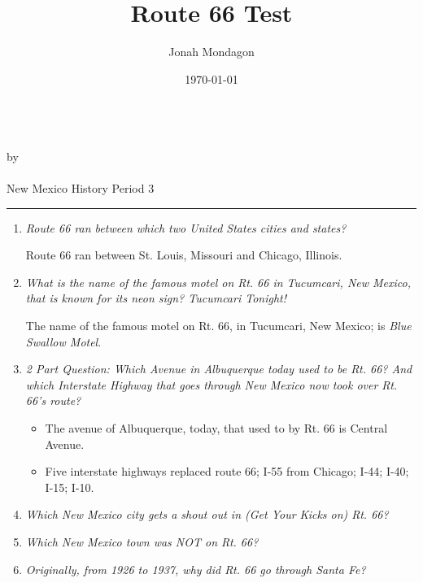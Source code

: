 \documentclass[12pt]{article}
\newcommand{\PutTitle}[1]
{
    \begin{center}
        {\huge\bfseries\thetitle}\\
        by \theauthor\\
        \thedate\\
        #1
    \end{center}
    \hrule
}
\begin{document}
\title{Route 66 Test}
\author{Jonah Mondagon}
\date{\today}
\PutTitle{New Mexico History Period 3}

\pagestyle{headings}

\doublespacing

\begin{enumerate}
    \item{\textit{Route 66 ran between which two United States cities and states?}}
        \begin{addmargin}[24pt]{0in}
            Route 66 ran between St. Louis, Missouri and Chicago, Illinois.
        \end{addmargin}
    \item{\textit{What is the name of the famous motel on Rt. 66 in Tucumcari, New Mexico, that is known for its neon sign? Tucumcari Tonight!}}
        \begin{addmargin}[24pt]{0in}
            The name of the famous motel on Rt. 66, in Tucumcari, New Mexico; is \textit{Blue Swallow Motel}.
        \end{addmargin}
    \item{\textit{2 Part Question: Which Avenue in Albuquerque today used to be Rt. 66? And which Interstate Highway that goes through New Mexico now took over Rt. 66's route?}}
        \begin{addmargin}[24pt]{0in}
            \begin{itemize}
                \item{The avenue of Albuquerque, today, that used to by Rt. 66 is Central Avenue.}
                \item{Five interstate highways replaced route 66; I-55 from Chicago; I-44; I-40; I-15; I-10.}
            \end{itemize}
        \end{addmargin}
    \item{\textit{Which New Mexico city gets a shout out in (Get Your Kicks on) Rt. 66?}}
        \begin{addmargin}[24pt]{0in}
        \end{addmargin}
    \item{\textit{Which New Mexico town was NOT on Rt. 66?}}
        \begin{addmargin}[24pt]{0in}
        \end{addmargin}
    \item{\textit{Originally, from 1926 to 1937, why did Rt. 66 go through Santa Fe?}}
        \begin{addmargin}[24pt]{0in}
        \end{addmargin}

\end{enumerate}
\end{document}
